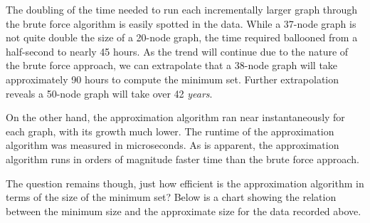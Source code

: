 \documentclass[paper.tex]{subfiles}
\begin{document}
\onehalfspacing

The doubling of the time needed to run each incrementally larger graph through the brute force algorithm is easily spotted in the data.
While a 37-node graph is not quite double the size of a 20-node graph, the time required ballooned from a half-second to nearly 45 hours.
As the trend will continue due to the nature of the brute force approach, we can extrapolate that a 38-node graph will take approximately 90 hours to compute the minimum set.
Further extrapolation reveals a 50-node graph will take over 42 \textit{years}.

On the other hand, the approximation algorithm ran near instantaneously for each graph, with its growth much lower.
The runtime of the approximation algorithm was measured in microseconds.
As is apparent, the approximation algorithm runs in orders of magnitude faster time than the brute force approach.

The question remains though, just how efficient is the approximation algorithm in terms of the size of the minimum set?
Below is a chart showing the relation between the minimum size and the approximate size for the data recorded above.

\vspace{5mm}

\begin{figure}[H]
\begin{center}
\end{center}
\end{figure}
\end{document}
